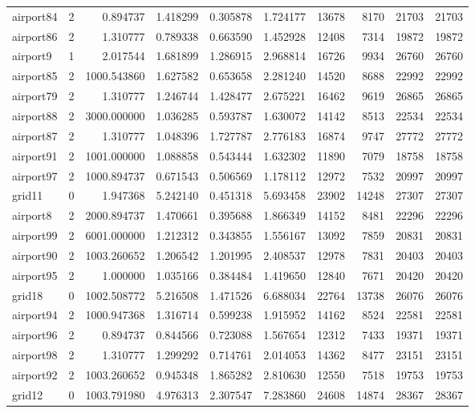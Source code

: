 \begin{longtable}{|l|r|r|r|r|r|r|r|r|r|}
airport84 & 2 & 0.894737 & 1.418299 & 0.305878 & 1.724177 & 13678 & 8170 & 21703 & 21703 \\
airport86 & 2 & 1.310777 & 0.789338 & 0.663590 & 1.452928 & 12408 & 7314 & 19872 & 19872 \\
airport9 & 1 & 2.017544 & 1.681899 & 1.286915 & 2.968814 & 16726 & 9934 & 26760 & 26760 \\
airport85 & 2 & 1000.543860 & 1.627582 & 0.653658 & 2.281240 & 14520 & 8688 & 22992 & 22992 \\
airport79 & 2 & 1.310777 & 1.246744 & 1.428477 & 2.675221 & 16462 & 9619 & 26865 & 26865 \\
airport88 & 2 & 3000.000000 & 1.036285 & 0.593787 & 1.630072 & 14142 & 8513 & 22534 & 22534 \\
airport87 & 2 & 1.310777 & 1.048396 & 1.727787 & 2.776183 & 16874 & 9747 & 27772 & 27772 \\
airport91 & 2 & 1001.000000 & 1.088858 & 0.543444 & 1.632302 & 11890 & 7079 & 18758 & 18758 \\
airport97 & 2 & 1000.894737 & 0.671543 & 0.506569 & 1.178112 & 12972 & 7532 & 20997 & 20997 \\
grid11 & 0 & 1.947368 & 5.242140 & 0.451318 & 5.693458 & 23902 & 14248 & 27307 & 27307 \\
airport8 & 2 & 2000.894737 & 1.470661 & 0.395688 & 1.866349 & 14152 & 8481 & 22296 & 22296 \\
airport99 & 2 & 6001.000000 & 1.212312 & 0.343855 & 1.556167 & 13092 & 7859 & 20831 & 20831 \\
airport90 & 2 & 1003.260652 & 1.206542 & 1.201995 & 2.408537 & 12978 & 7831 & 20403 & 20403 \\
airport95 & 2 & 1.000000 & 1.035166 & 0.384484 & 1.419650 & 12840 & 7671 & 20420 & 20420 \\
grid18 & 0 & 1002.508772 & 5.216508 & 1.471526 & 6.688034 & 22764 & 13738 & 26076 & 26076 \\
airport94 & 2 & 1000.947368 & 1.316714 & 0.599238 & 1.915952 & 14162 & 8524 & 22581 & 22581 \\
airport96 & 2 & 0.894737 & 0.844566 & 0.723088 & 1.567654 & 12312 & 7433 & 19371 & 19371 \\
airport98 & 2 & 1.310777 & 1.299292 & 0.714761 & 2.014053 & 14362 & 8477 & 23151 & 23151 \\
airport92 & 2 & 1003.260652 & 0.945348 & 1.865282 & 2.810630 & 12550 & 7518 & 19753 & 19753 \\
grid12 & 0 & 1003.791980 & 4.976313 & 2.307547 & 7.283860 & 24608 & 14874 & 28367 & 28367 \\

\end{longtable}
